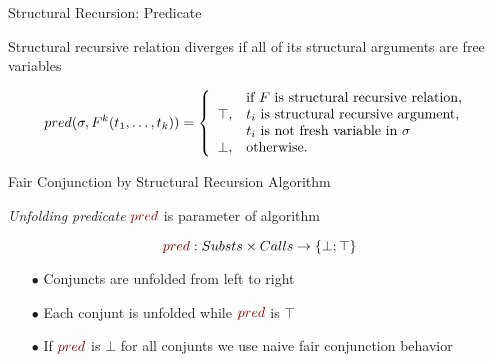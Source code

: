 \documentclass[14pt,aspectratio=169]{beamer}
\let\\\tabularnewline
\let\\\tabularnewline
\newcommand{\set}[1]{\{#1\}}
\theoremstyle{definition}
\begin{document}
\begin{frame}[fragile]{Structural Recursion: Predicate}

\centering
Structural recursive relation diverges if all of its structural arguments are free variables

\[
pred(\sigma, F^k(t_1, \ldots, t_k)) = \left\{
\begin{array}{cl}
      & \mbox{if } F \mbox{ is structural recursive relation, } \\
\top, & t_i \mbox { is structural recursive argument, } \\
      & t_i \mbox { is not fresh variable in } \sigma \\
\bot, & \mbox{otherwise.}
\end{array}
\right.
\]
\end{frame}

\begin{frame}[fragile]{Fair Conjunction by Structural Recursion Algorithm}
\begin{center}
\emph{Unfolding predicate} $\textcolor{myRed}{pred}$ is parameter of algorithm
\end{center}
$$\textcolor{myRed}{pred} : Substs \times Calls \rightarrow \set{\bot; \top}$$
\vskip5mm
\begin{itemize}

    \item[$\bullet$] Conjuncts are unfolded from left to right
    \item[$\bullet$] Each conjunt is unfolded while $\textcolor{myRed}{pred}$ is $\top$
    \item[$\bullet$] If $\textcolor{myRed}{pred}$ is $\bot$ for all conjunts we use naive fair conjunction behavior

\end{itemize}
\end{frame}
\end{document}
